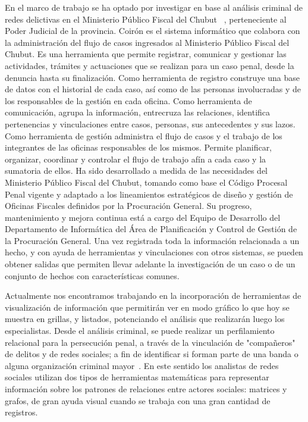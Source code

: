 En el marco de trabajo se ha optado por investigar en base al análisis criminal de redes delictivas en el Ministerio Público Fiscal del Chubut ~\cite{MPFChubutPaginaWeb}, perteneciente al Poder Judicial de la provincia.
Coirón es el sistema informático que colabora con la administración del flujo de casos ingresados al Ministerio Público Fiscal del Chubut. Es una herramienta que permite registrar, comunicar y gestionar las actividades, trámites y actuaciones que se realizan para un caso penal, desde la denuncia hasta su finalización. 
Como herramienta de registro construye una base de datos con el historial de cada caso, así como de las personas involucradas y de los responsables de la gestión en cada oficina. Como herramienta de comunicación, agrupa la información, entrecruza las relaciones, identifica pertenencias y vinculaciones entre casos, personas, sus antecedentes y sus lazos. Como herramienta de gestión administra el flujo de casos y el trabajo de los integrantes de las oficinas responsables de los mismos. Permite planificar, organizar, coordinar y controlar el flujo de trabajo afín a cada caso y la sumatoria de ellos.
Ha sido desarrollado a medida de las necesidades del Ministerio Público Fiscal del Chubut, tomando como base el Código Procesal Penal vigente y adaptado a los lineamientos estratégicos de diseño y gestión de Oficinas Fiscales definidos por la Procuración General. Su progreso, mantenimiento y mejora continua está a cargo del Equipo de Desarrollo del Departamento de Informática del Área de Planificación y Control de Gestión de la Procuración General. Una vez registrada toda la información relacionada a un hecho, y con ayuda de herramientas y vinculaciones con otros sistemas, se pueden obtener salidas que permiten llevar adelante la investigación de un caso o de un conjunto de hechos con características comunes.

Actualmente nos encontramos trabajando en la incorporación de herramientas de visualización de información que permitirán ver en modo gráfico lo que hoy se muestra en grillas, y listados, potenciando el análisis que realizarán luego los especialistas. Desde el análisis criminal, se puede realizar un perfilamiento relacional para la persecución penal, a través de la vinculación de "compañeros" de delitos y de redes sociales; a fin de identificar si forman parte de una banda o alguna organización criminal mayor~\cite{rua2020perspectiva}. En este sentido los analistas de redes sociales utilizan dos tipos de herramientas matemáticas para representar información sobre los patrones de relaciones entre actores sociales: matrices y grafos, de gran ayuda visual cuando se trabaja con una gran cantidad de registros.

